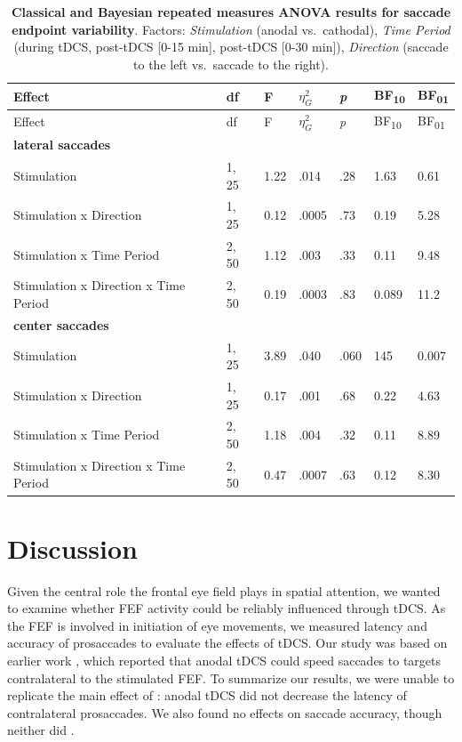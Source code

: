 \documentclass[11pt,]{memoir}
\begin{document}
\begin{longtable}[]{@{}lllllll@{}}
\caption{\label{tab:tab-variability} \textbf{Classical and Bayesian repeated measures ANOVA results for saccade endpoint variability}. Factors: \emph{Stimulation} (anodal vs.~cathodal), \emph{Time Period} (during tDCS, post-tDCS {[}0-15 min{]}, post-tDCS {[}0-30 min{]}), \emph{Direction} (saccade to the left vs.~saccade to the right).}\tabularnewline
\toprule
Effect & df & F & \(\eta_{G}^{2}\) & \emph{p} & BF\textsubscript{10} & BF\textsubscript{01}\tabularnewline
\midrule
\endfirsthead
\toprule
Effect & df & F & \(\eta_{G}^{2}\) & \emph{p} & BF\textsubscript{10} & BF\textsubscript{01}\tabularnewline
\midrule
\endhead
\textbf{lateral saccades} & & & & & &\tabularnewline
Stimulation & 1, 25 & 1.22 & .014 & .28 & 1.63 & 0.61\tabularnewline
Stimulation x Direction & 1, 25 & 0.12 & .0005 & .73 & 0.19 & 5.28\tabularnewline
Stimulation x Time Period & 2, 50 & 1.12 & .003 & .33 & 0.11 & 9.48\tabularnewline
Stimulation x Direction x Time Period & 2, 50 & 0.19 & .0003 & .83 & 0.089 & 11.2\tabularnewline
\textbf{center saccades} & & & & & &\tabularnewline
Stimulation & 1, 25 & 3.89 & .040 & .060 & 145 & 0.007\tabularnewline
Stimulation x Direction & 1, 25 & 0.17 & .001 & .68 & 0.22 & 4.63\tabularnewline
Stimulation x Time Period & 2, 50 & 1.18 & .004 & .32 & 0.11 & 8.89\tabularnewline
Stimulation x Direction x Time Period & 2, 50 & 0.47 & .0007 & .63 & 0.12 & 8.30\tabularnewline
\bottomrule
\end{longtable}

\endgroup

\hypertarget{sacc_tDCS-discussion}{%
\section{Discussion}\label{sacc_tDCS-discussion}}

Given the central role the frontal eye field plays in spatial attention, we wanted to examine whether FEF activity could be reliably influenced through tDCS. As the FEF is involved in initiation of eye movements, we measured latency and accuracy of prosaccades to evaluate the effects of tDCS. Our study was based on earlier work \autocite{Kanai2012}, which reported that anodal tDCS could speed saccades to targets contralateral to the stimulated FEF. To summarize our results, we were unable to replicate the main effect of \textcite{Kanai2012}: anodal tDCS did not decrease the latency of contralateral prosaccades. We also found no effects on saccade accuracy, though neither did \textcite{Kanai2012}.
\end{document}
